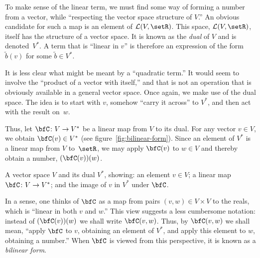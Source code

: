 \documentclass[10pt, a4paper]{article}
\begin{document}
To make sense of the linear term, we must find some way of forming a
number from a vector, while “respecting the vector space structure of
$V$.” An obvious candidate for such a map is an element of $\mathcal{L}(V,
\setR)$. This space, $\mathcal{L}(V, \setR)$, itself has the structure of a
vector space. It is known as the \emph{dual} of $V$ and is
denoted~$V^*$. A term that is “linear in $v$” is therefore an
expression of the form $\tilde{b}(v)$ for some $\tilde{b}\in V^*$.

It is less clear what might be meant by a “quadratic term.” It would
seem to involve the “product of a vector with itself,” and that is not
an operation that is obviously available in a general vector
space. Once again, we make use of the dual space. The idea is to start
with $v$, somehow “carry it across” to $V^*$, and then act with the
result on~$w$.

Thus, let $\bfC\colon V\to V^*$ be a linear map from $V$ to its
dual. For any vector $v\in V$, we obtain $\bfC(v)\in V^*$ (see
figure~\ref{fig:bilinear-form}). Since an element of $V^*$ is a linear
map from $V$ to~$\setR$, we may apply $\bfC(v)$ to $w\in V$ and thereby
obtain a number, $(\bfC(v))(w)$.

\begin{marginfigure}
  \begin{center}
  \end{center}
  \caption{A vector space $V$ and its dual $V^*$, showing: an element
    $v\in V$; a linear map $\bfC\colon V\to V^*$; and the image of $v$ in
    $V^*$ under $\bfC$.\label{fig:bilinear-form}}
\end{marginfigure}
In a sense, one thinks of $\bfC$ as a map from pairs
$(v,w)\in V\times V$ to the reals, which is “linear in both $v$ and
$w$.” This view suggests a less cumbersome notation: instead of
$(\bfC(v))(w)$ we shall write $\bfC(v,w)$. Thus, by $\bfC(v, w)$ we
shall mean, “apply $\bfC$ to $v$, obtaining an element of $V^*$, and
apply this element to $w$, obtaining a number.” When $\bfC$ is viewed
from this perspective, it is known as a \emph{bilinear form}.
\end{document}
